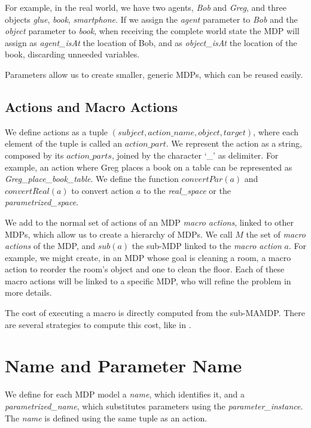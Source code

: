 For example, in the real world, we have two agents, \textit{Bob} and \textit{Greg}, and three objects \textit{glue}, \textit{book}, \textit{smartphone}. If we assign the \textit{agent} parameter to \textit{Bob} and the \textit{object} parameter to \textit{book}, when receiving the complete world state the MDP will assign as \textit{agent\_isAt} the location of Bob, and as \textit{object\_isAt} the location of the book, discarding unneeded variables.

Parameters allow us to create smaller, generic MDPs, which can be reused easily.


\subsection{Actions and Macro Actions}
We define actions as a tuple $(subject,action\_name,object,target)$, where each element of the tuple is called an $action\_part$.  We represent the action as a string, composed by its $action\_parts$, joined by the character `\_' as delimiter. For example, an action where Greg places a book on a table can be represented as \textit{Greg\_place\_book\_table}. We define the function $convertPar(a)$ and $convertReal(a)$ to convert action $a$ to the \textit{real\_space} or the \textit{parametrized\_space}.

We add to the normal set of actions of an MDP \textit{macro actions}, linked to other MDPs, which allow us to create a hierarchy of MDPs. We call $M$ the set of \textit{macro actions} of the MDP, and $sub(a)$ the sub-MDP linked to the \textit{macro action} $a$. For example, we might create, in an MDP whose goal is cleaning a room, a macro action to reorder the room's object and one to clean the floor. Each of these macro actions will be linked to a specific MDP, who will refine the problem in more details.

The cost of executing a macro is directly computed from the sub-MAMDP. There are several strategies to compute this cost, like in \cite{dietterich2000hierarchical,hauskrecht1998hierarchical}.

\section{Name and Parameter Name}
We define for each MDP model a \textit{name}, which identifies it, and a \textit{parametrized\_name}, which substitutes parameters using the \textit{parameter\_instance}. The \textit{name} is defined using the same tuple as an action. 

